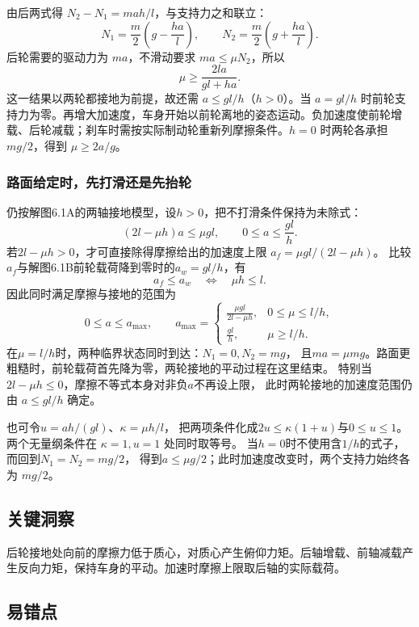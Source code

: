 \documentclass[UTF8,fontset=fandol,a4paper,11pt]{ctexart}
\newcommand{\result}[1]{\begin{equation*}\boxed{#1}\end{equation*}}
\begin{document}
由后两式得 $N_2-N_1=mah/l$，与支持力之和联立：
\[
 N_1=\frac m2\left(g-\frac{ha}{l}\right),\qquad
 N_2=\frac m2\left(g+\frac{ha}{l}\right).
\]
后轮需要的驱动力为 $ma$，不滑动要求 $ma\le\mu N_2$，所以
\[\result{\mu\ge\frac{2la}{gl+ha}.}\]
这一结果以两轮都接地为前提，故还需 $a\le gl/h$（$h>0$）。当 $a=gl/h$ 时前轮支持力为零。再增大加速度，车身开始以前轮离地的姿态运动。负加速度使前轮增载、后轮减载；刹车时需按实际制动轮重新列摩擦条件。$h=0$ 时两轮各承担 $mg/2$，得到 $\mu\ge2a/g$。
\subsubsection*{路面给定时，先打滑还是先抬轮}
仍按解图6.1A的两轴接地模型，设$h>0$，把不打滑条件保持为未除式：
\[
(2l-\mu h)a\leq\mu gl,\qquad 0\leq a\leq\frac{gl}{h}.
\]
若$2l-\mu h>0$，才可直接除得摩擦给出的加速度上限
$a_f=\mu gl/(2l-\mu h)$。
比较$a_f$与解图6.1B前轮载荷降到零时的$a_w=gl/h$，有
\[
a_f\leq a_w\quad\Longleftrightarrow\quad\mu h\leq l.
\]
因此同时满足摩擦与接地的范围为
\[
0\leq a\leq a_{\max},\qquad
a_{\max}=\begin{cases}
\displaystyle\frac{\mu gl}{2l-\mu h},&0\leq\mu\leq l/h,\\[5pt]
\displaystyle\frac{gl}{h},&\mu\geq l/h.
\end{cases}
\]
在$\mu=l/h$时，两种临界状态同时到达：$N_1=0,N_2=mg$，
且$ma=\mu mg$。路面更粗糙时，前轮载荷首先降为零，两轮接地的平动过程在这里结束。
特别当$2l-\mu h\leq0$，摩擦不等式本身对非负$a$不再设上限，
此时两轮接地的加速度范围仍由 $a\leq gl/h$ 确定。

也可令$u=ah/(gl)$、$\kappa=\mu h/l$，
把两项条件化成$2u\leq\kappa(1+u)$与$0\leq u\leq1$。
两个无量纲条件在 $\kappa=1,u=1$ 处同时取等号。
当$h=0$时不使用含$1/h$的式子，而回到$N_1=N_2=mg/2$，
得到$a\leq\mu g/2$；此时加速度改变时，两个支持力始终各为 $mg/2$。




\subsection*{关键洞察}

后轮接地处向前的摩擦力低于质心，对质心产生俯仰力矩。后轴增载、前轴减载产生反向力矩，保持车身的平动。加速时摩擦上限取后轴的实际载荷。



\subsection*{易错点}
\end{document}
